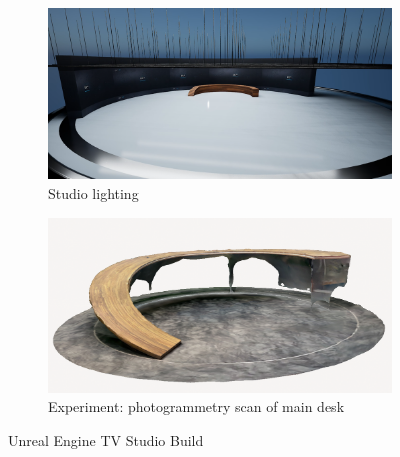 \documentclass[
  a4paper,  %
  twoside,  %
  bibliography=totoc,
  headsepline,
  cleardoublepage=empty,
  parskip=half,
  draft=false
]{scrbook}
\begin{document}
\begin{figure}[h]
  \begin{subfigure}{0.45\textwidth}
    \includegraphics[width=\linewidth]{graphics/images/unreal-engine/studio/studio-totale.png}
    \caption{Studio lighting}
  \end{subfigure}
  \begin{subfigure}{0.45\textwidth}
    \includegraphics[width=\linewidth]{graphics/images/unreal-engine/studio/Photogrammetry-Desk.png}
    \caption{Experiment: photogrammetry scan of main desk}
    \label{fig:photogrammetry-desk}
  \end{subfigure}

  \caption{Unreal Engine TV Studio Build}
  \label{fig:ue-studio-build}
\end{figure}
\end{document}
